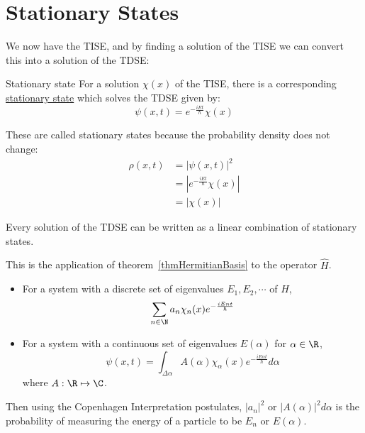 \documentclass[../Main.tex]{subfiles}
\begin{document}
\section{Stationary States}
We now have the TISE, and by finding a solution of the TISE we can convert this into a solution of the TDSE:
\begin{definition}{Stationary state}
    For a solution $\chi(x)$ of the TISE, there is a corresponding \underline{stationary state} which solves the TDSE given by:
    \begin{equation}
        \psi(x, t) = e^{-\frac{iEt}{\hbar}} \chi(x)
        \label{eqnStnState}
    \end{equation}
\end{definition}
These are called stationary states because the probability density does not change:
\begin{align*}
    \rho(x, t) &= |\psi(x, t)|^2 \\
    &= \left|e^{-\frac{iEt}{\hbar}} \chi(x)\right| \\
    &= \left|\chi(x)\right|
\end{align*}
\begin{theorem}
    Every solution of the TDSE can be written as a linear combination of stationary states.
    \label{thmStationaryBasis}
\end{theorem}
\begin{remark}
    This is the application of theorem~\ref{thmHermitianBasis} to the operator $\hat{H}$.
\end{remark}
\begin{itemize}
    \item For a system with a discrete set of eigenvalues $E_1, E_2, \cdots$ of $\hat{H}$,
        \begin{equation*}
            \sum_{n \in \N} a_n \chi_n(x) e^{-\frac{iEnt}{\hbar}}
        \end{equation*}
    \item For a system with a continuous set of eigenvalues $E(\alpha)$ for $\alpha \in \R$,
        \begin{equation*}
            \psi(x, t) = \int_{\Delta \alpha} A(\alpha) \chi_\alpha(x) e^{-\frac{iE\alpha t}{\hbar}} d\alpha
        \end{equation*}
        where $A : \R\mapsto\C$.
\end{itemize}
Then using the Copenhagen Interpretation postulates, $|a_n|^2$ or $|A(\alpha)|^2 d\alpha$ is the probability of measuring the energy of a particle to be $E_n$ or $E(\alpha)$.
\end{document}

